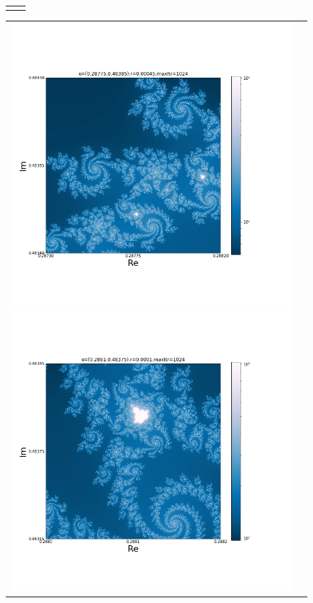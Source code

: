 \documentclass[uplatex,a4paper,11pt,oneside,openany]{jsbook}
\begin{document}
\begin{figure}[H]
\begin{tabular}{cc}
\begin{minipage}{0.5\hsize}
      \end{minipage}
    \end{tabular}
\end{figure}%

\begin{figure}[H]
  \centering
    \begin{tabular}{cc}
      \begin{minipage}{0.5\hsize}
        \centering
  \includegraphics[bb=25 100 650 600,keepaspectratio,clip,scale=0.35]{../src/figure/mandel007.png}
      \end{minipage}
      \begin{minipage}{0.5\hsize}
        \centering
  \includegraphics[bb=25 100 650 600,keepaspectratio,clip,scale=0.35]{../src/figure/mandel008.png}

\end{minipage}
\end{tabular}
\end{figure}
\end{document}
